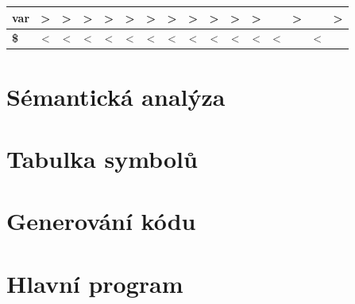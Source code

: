 \documentclass[11pt,a4paper]{article}
\renewcommand{\familydefault}{\sfdefault}
\begin{document}
\begin{table}[H]
{\begin{tabular}{|l|c|c|c|c|c|c|c|c|c|c|c|c|c|c|c|}
		\textbf{var}             & \textgreater{} & \textgreater{} & \textgreater{} & \textgreater{} & \textgreater{} & \textgreater{}       & \textgreater{}          & \textgreater{}        & \textgreater{}           & \textgreater{} & \textgreater{} &             & \textgreater{} &             & \textgreater{} \\ \hline
		\textbf{\$}              & \textless{}    & \textless{}    & \textless{}    & \textless{}    & \textless{}    & \textless{}          & \textless{}             & \textless{}           & \textless{}              & \textless{}    & \textless{}    & \textless{} &                & \textless{} &                \\ \hline
	\end{tabular}}
\end{table}
                        
\renewcommand{\familydefault}{\sfdefault}

\section{Sémantická analýza}


\section{Tabulka symbolů}


\section{Generování kódu}
    

\section{Hlavní program}
\end{document}
